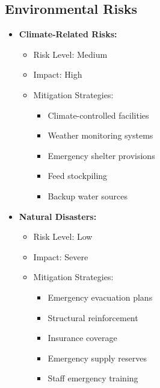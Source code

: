 \subsection{Environmental Risks}
\begin{itemize}
    \item \textbf{Climate-Related Risks:}
    \begin{itemize}
        \item Risk Level: Medium
        \item Impact: High
        \item Mitigation Strategies:
        \begin{itemize}
            \item Climate-controlled facilities
            \item Weather monitoring systems
            \item Emergency shelter provisions
            \item Feed stockpiling
            \item Backup water sources
        \end{itemize}
    \end{itemize}
    
    \item \textbf{Natural Disasters:}
    \begin{itemize}
        \item Risk Level: Low
        \item Impact: Severe
        \item Mitigation Strategies:
        \begin{itemize}
            \item Emergency evacuation plans
            \item Structural reinforcement
            \item Insurance coverage
            \item Emergency supply reserves
            \item Staff emergency training
        \end{itemize}
    \end{itemize}
\end{itemize}

